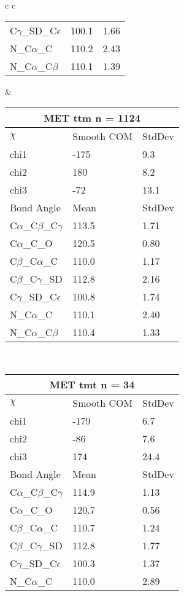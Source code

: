 \begin{longtable}{ c c }
\begin{tabular}{ l l l }
  C$\gamma$\_SD\_C$\epsilon$ & 100.1 & 1.66\\
  N\_C$\alpha$\_C & 110.2 & 2.43\\
  N\_C$\alpha$\_C$\beta$ & 110.1 & 1.39\\
  \bottomrule
  \end{tabular}
  &
  \begin{tabular}{ l l l }
  \toprule
  \multicolumn{3}{c}{MET \textbf{ttm} n = 1124} \\ \toprule
  $\chi$       & Smooth COM & StdDev \\ \midrule
  chi1 & -175 & 9.3 \\ 
  chi2 & 180 & 8.2 \\ 
  chi3 & -72 & 13.1 \\ \midrule
  Bond Angle   & Mean     & StdDev \\ \midrule
  C$\alpha$\_C$\beta$\_C$\gamma$ & 113.5 & 1.71\\
  C$\alpha$\_C\_O & 120.5 & 0.80\\
  C$\beta$\_C$\alpha$\_C & 110.0 & 1.17\\
  C$\beta$\_C$\gamma$\_SD & 112.8 & 2.16\\
  C$\gamma$\_SD\_C$\epsilon$ & 100.8 & 1.74\\
  N\_C$\alpha$\_C & 110.1 & 2.40\\
  N\_C$\alpha$\_C$\beta$ & 110.4 & 1.33\\
  \bottomrule
  \end{tabular}
  \\
  \begin{tabular}{ l l l }
  \toprule
  \multicolumn{3}{c}{MET \textbf{tmt} n = 34} \\ \toprule
  $\chi$       & Smooth COM & StdDev \\ \midrule
  chi1 & -179 & 6.7 \\ 
  chi2 & -86 & 7.6 \\ 
  chi3 & 174 & 24.4 \\ \midrule
  Bond Angle   & Mean     & StdDev \\ \midrule
  C$\alpha$\_C$\beta$\_C$\gamma$ & 114.9 & 1.13\\
  C$\alpha$\_C\_O & 120.7 & 0.56\\
  C$\beta$\_C$\alpha$\_C & 110.7 & 1.24\\
  C$\beta$\_C$\gamma$\_SD & 112.8 & 1.77\\
  C$\gamma$\_SD\_C$\epsilon$ & 100.3 & 1.37\\
  N\_C$\alpha$\_C & 110.0 & 2.89\\

\end{tabular}
\end{longtable}
